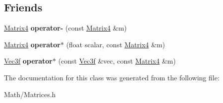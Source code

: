 \subsection*{Friends}
\begin{DoxyCompactItemize}
\item 
\mbox{\label{class_matrix4_a9d189e964a989207c8489e80276dadd4}} 
\hyperlink{class_matrix4}{Matrix4} {\bfseries operator-\/} (const \hyperlink{class_matrix4}{Matrix4} \&m)
\item 
\mbox{\label{class_matrix4_ab1dd86a7d3fd19e91a596c844ba89061}} 
\hyperlink{class_matrix4}{Matrix4} {\bfseries operator$\ast$} (float scalar, const \hyperlink{class_matrix4}{Matrix4} \&m)
\item 
\mbox{\label{class_matrix4_afdc4698112c038343150d1feff5bedb9}} 
\hyperlink{struct_vec3f}{Vec3f} {\bfseries operator$\ast$} (const \hyperlink{struct_vec3f}{Vec3f} \&vec, const \hyperlink{class_matrix4}{Matrix4} \&m)
\end{DoxyCompactItemize}


The documentation for this class was generated from the following file\+:\begin{DoxyCompactItemize}
\item 
Math/Matrices.\+h\end{DoxyCompactItemize}
